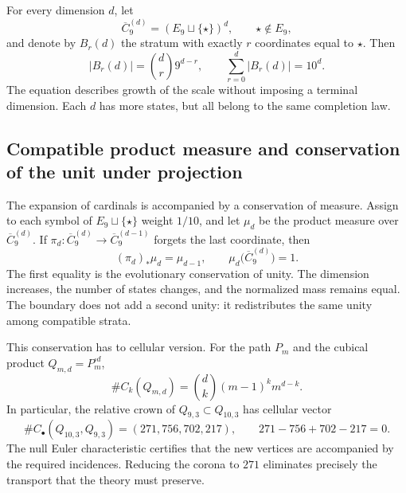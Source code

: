 For every dimension \(d\), let
\begin{equation}\label{p12-83-c0-s2:eq:amp-completacion-d}
 \overline C_9^{(d)}=(E_9\sqcup\{\star\})^d,
 \qquad \star\notin E_9,
\end{equation}
and denote by \(B_r(d)\) the stratum with exactly \(r\) coordinates equal to
\(\star\). Then
\begin{equation}\label{p12-83-c0-s2:eq:amp-estratos-binomial}
 |B_r(d)|=\binom dr9^{d-r},
 \qquad
 \sum_{r=0}^{d}|B_r(d)|=10^d.
\end{equation}
The equation describes growth of the scale without imposing a terminal
dimension. Each \(d\) has more states, but all belong to the same
completion law.

\subsection{Compatible product measure and conservation of the unit under projection}

The expansion of cardinals is accompanied by a conservation of measure. Assign
to each symbol of \(E_9\sqcup\{\star\}\) weight \(1/10\), and let \(\mu_d\) be the
product measure over \(\overline C_9^{(d)}\). If
\(\pi_d:\overline C_9^{(d)}\to\overline C_9^{(d-1)}\) forgets the last
coordinate, then
\begin{equation}\label{p12-83-c0-s2:eq:amp-conservacion-proyectiva}
 (\pi_d)_*\mu_d=\mu_{d-1},
 \qquad
 \mu_d\bigl(\overline C_9^{(d)}\bigr)=1.
\end{equation}
The first equality is the evolutionary conservation of unity. The dimension
increases, the number of states changes, and the normalized mass remains equal.
The boundary does not add a second unity: it redistributes the same unity among
compatible strata.

This conservation has to cellular version. For the path \(P_m\) and the
cubical product \(Q_{m,d}=P_m^{\square d}\),
\begin{equation}\label{p12-83-c0-s2:eq:amp-celdas-cubicales}
 \#C_k(Q_{m,d})=\binom dk(m-1)^k m^{d-k}.
\end{equation}
In particular, the relative crown of \(Q_{9,3}\subset Q_{10,3}\) has
cellular vector
\begin{equation}\label{p12-83-c0-s2:eq:amp-corona-completa}
 \#C_\bullet(Q_{10,3},Q_{9,3})=(271,756,702,217),
 \qquad 271-756+702-217=0.
\end{equation}
The null Euler characteristic certifies that the new vertices are
accompanied by the required incidences. Reducing the corona to \(271\) eliminates
precisely the transport that the theory must preserve.


